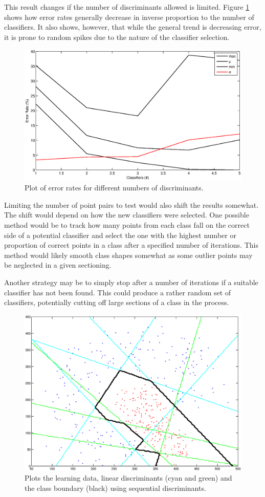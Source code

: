 This result changes if the number of discriminants allowed is limited. Figure
\ref{fig:error_rates} shows how error rates generally decrease in inverse
proportion to the number of classifiers. It also shows, however, that while the
general trend is decreasing error, it is prone to random spikes due to the
nature of the classifier selection.

\begin{figure}
\label{fig:error_rates}
\includegraphics[scale=0.6]{sequence_error_plots}
\caption{Plot of error rates for different numbers of discriminants.}
\end{figure}

Limiting the number of point pairs to test would also shift the results
somewhat. The shift would depend on how the new classifiers were selected. One
possible method would be to track how many points from each class fall on the
correct side of a potential classifier and select the one with the highest
number or proportion of correct points in a class after a specified number of
iterations. This method would likely smooth class shapes somewhat as some
outlier points may be neglected in a given sectioning.

Another strategy may be to simply stop after a number of iterations if a
suitable classifier has not been found. This could produce a rather random set
of classifiers, potentially cutting off large sections of a class in the
process.

\begin{figure}
\label{fig:sequential_bounds}
\includegraphics[scale=0.5]{sequential_bounds}
\caption{Plots the learning data, linear discriminants (cyan and green) and the
class boundary (black) using sequential discriminants.}
\end{figure}